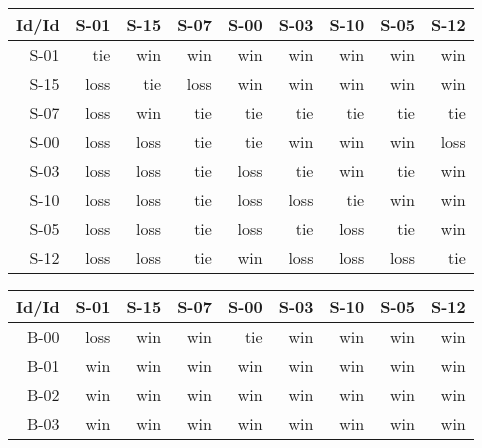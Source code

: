\begin{tabular}{ | r | r | r | r | r | r | r | r | r | }
    \hline
        Id/Id  &   S-01  &   S-15  &   S-07  &   S-00  &   S-03  &   S-10  &   S-05  &   S-12  \\
    \hline
    \hline
         S-01  &    tie  &    win  &    win  &    win  &    win  &    win  &    win  &    win  \\
    \hline
         S-15  &   loss  &    tie  &   loss  &    win  &    win  &    win  &    win  &    win  \\
    \hline
         S-07  &   loss  &    win  &    tie  &    tie  &    tie  &    tie  &    tie  &    tie  \\
    \hline
         S-00  &   loss  &   loss  &    tie  &    tie  &    win  &    win  &    win  &   loss  \\
    \hline
         S-03  &   loss  &   loss  &    tie  &   loss  &    tie  &    win  &    tie  &    win  \\
    \hline
         S-10  &   loss  &   loss  &    tie  &   loss  &   loss  &    tie  &    win  &    win  \\
    \hline
         S-05  &   loss  &   loss  &    tie  &   loss  &    tie  &   loss  &    tie  &    win  \\
    \hline
         S-12  &   loss  &   loss  &    tie  &    win  &   loss  &   loss  &   loss  &    tie  \\
    \hline
\end{tabular}


\begin{tabular}{ | r | r | r | r | r | r | r | r | r | }
    \hline
        Id/Id  &   S-01  &   S-15  &   S-07  &   S-00  &   S-03  &   S-10  &   S-05  &   S-12  \\
    \hline
    \hline
         B-00  &   loss  &    win  &    win  &    tie  &    win  &    win  &    win  &    win  \\
    \hline
         B-01  &    win  &    win  &    win  &    win  &    win  &    win  &    win  &    win  \\
    \hline
         B-02  &    win  &    win  &    win  &    win  &    win  &    win  &    win  &    win  \\
    \hline
         B-03  &    win  &    win  &    win  &    win  &    win  &    win  &    win  &    win  \\
    \hline
\end{tabular}




